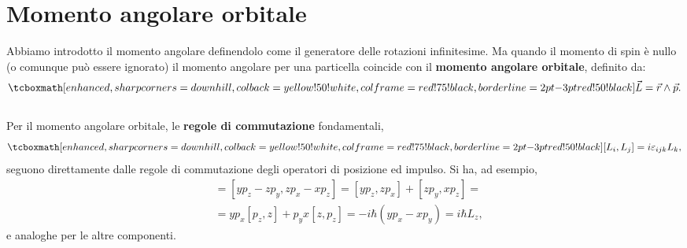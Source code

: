 \pagestyle{VS}
\chapter[Momento angolare orbitale]{Momento angolare orbitale}
Abbiamo introdotto il momento angolare definendolo come il generatore delle rotazioni infinitesime. Ma quando il momento di spin è nullo (o comunque può essere ignorato) il momento angolare per una particella coincide con il \textbf{momento angolare orbitale}, definito da:
	\begin{equation}
		\tcboxmath[enhanced, sharp corners=downhill, colback=yellow!50!white, colframe=red!75!black, borderline={2pt}{-3pt}{red!50!black}]{
			\vec{L}=\vec{r}\wedge\vec{p}.
			}
	\end{equation}\\
	
Per il momento angolare orbitale, le \textbf{regole di commutazione} fondamentali,
	\begin{equation}
		\tcboxmath[enhanced, sharp corners=downhill, colback=yellow!50!white, colframe=red!75!black, borderline={2pt}{-3pt}{red!50!black}]{
			[L_i, L_j]= i \varepsilon _{ijk}L_k ,
			}
	\label{eq:cap17_1}
	\end{equation}
seguono direttamente dalle regole di commutazione degli operatori di posizione ed impulso. Si ha, ad esempio,
	\begin{align}
		[L_x , L_y] &= [y p_z - zp_y, zp_x -xp_z] =  [y p_z , zp_x] + [zp_y, xp_z] = \nonumber \\
		&= yp_x [p_z , z] + p_y x [z , p_z] =   -i\hbar (yp_x -xp_y) = i\hbar L_z ,
	\end{align}
e analoghe per le altre componenti.\\

